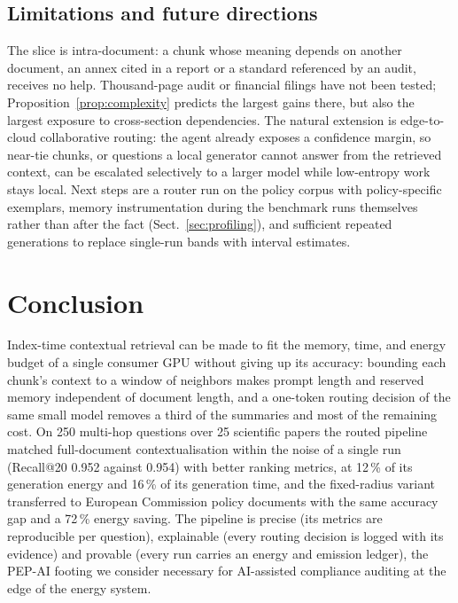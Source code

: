 \documentclass[pdflatex,sn-mathphys-num]{sn-jnl}
\makeatletter
\newif\ifprovenance
\newcommand{\verify}[1]{\ifprovenance\textcolor{red}{{\footnotesize [VERIFY: #1]}}\fi}
\newcommand{\Rec}[1]{Recall@#1}
\theoremstyle{thmstyleone}%
\theoremstyle{thmstylethree}%
\makeatother
\begin{document}
\subsection{Limitations and future directions}
The slice is intra-document: a chunk whose meaning depends on another document, an annex cited in a report or a standard referenced by an audit, receives no help. Thousand-page audit or financial filings have not been tested; Proposition~\ref{prop:complexity} predicts the largest gains there, but also the largest exposure to cross-section dependencies. The natural extension is edge-to-cloud collaborative routing: the agent already exposes a confidence margin, so near-tie chunks, or questions a local generator cannot answer from the retrieved context, can be escalated selectively to a larger model while low-entropy work stays local. Next steps are a router run on the policy corpus with policy-specific exemplars, memory instrumentation during the benchmark runs themselves rather than after the fact (Sect.~\ref{sec:profiling}), and sufficient repeated generations to replace single-run bands with interval estimates.

\section{Conclusion}\label{sec:conclusion}

Index-time contextual retrieval can be made to fit the memory, time, and energy budget of a single consumer GPU without giving up its accuracy: bounding each chunk's context to a window of neighbors makes prompt length and reserved memory independent of document length, and a one-token routing decision of the same small model removes a third of the summaries and most of the remaining cost. On 250 multi-hop questions over 25 scientific papers the routed pipeline matched full-document contextualisation within the noise of a single run (\Rec{20} 0.952 against 0.954) with better ranking metrics, at 12\,\% of its generation energy and 16\,\% of its generation time, and the fixed-radius variant transferred to European Commission policy documents with the same accuracy gap and a 72\,\% energy saving.\verify{$13.22/106.68=0.124$ and $525.3/3294.3=0.159$ (Table~\ref{tab:primary}); $1-5.08/18.00=0.718$ (Table~\ref{tab:policy})} The pipeline is precise (its metrics are reproducible per question), explainable (every routing decision is logged with its evidence) and provable (every run carries an energy and emission ledger), the PEP-AI footing we consider necessary for AI-assisted compliance auditing at the edge of the energy system.
\end{document}
